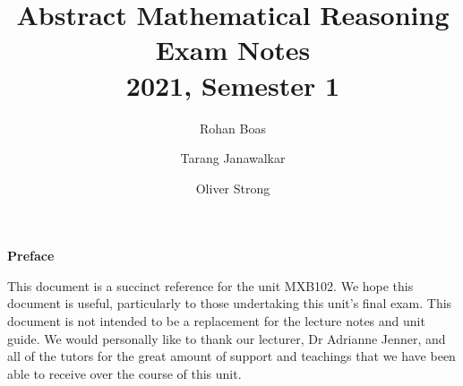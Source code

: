 \documentclass{article}
\title{\textbf{Abstract Mathematical Reasoning}
    \texorpdfstring{\\}{ } {\large Exam Notes}
    \texorpdfstring{\\}{ } {\normalsize 2021, Semester 1}}
\author{
    Rohan Boas \and Tarang Janawalkar \and Oliver Strong
}
\date{}
\begin{document}
%
\begin{titlepage}
    \maketitle
    \thispagestyle{empty}
    \vspace*{\fill}
    \begin{adjustwidth}{4cm}{4cm}
        {\Large\bf Preface}
        \vspace{0.7em}

        This document is a succinct reference for the unit MXB102.
        We hope this document is useful, particularly to those undertaking this unit's final exam.
        This document is not intended to be a replacement for the lecture notes and unit guide.
        We would personally like to thank our lecturer, Dr Adrianne Jenner,
        and all of the tutors for the great amount of support and teachings
        that we have been able to receive over the course of this unit.
    \end{adjustwidth}
    \vspace*{\fill}
    \doclicenseThis
    \thispagestyle{empty}
\end{titlepage}
%
\newpage
%
\end{document}
